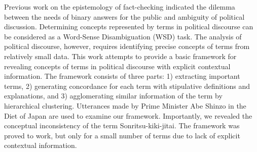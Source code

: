 Previous work on the epistemology of fact-checking indicated the dilemma between the needs of binary answers for the public and ambiguity of political discussion. Determining concepts represented by terms in political discourse can be considered as a Word-Sense Disambiguation (WSD) task. The analysis of political discourse, however, requires identifying precise concepts of terms from relatively small data. This work attempts to provide a basic framework for revealing concepts of terms in political discourse with explicit contextual information. The framework consists of three parts: 1) extracting important terms, 2) generating concordance for each term with stipulative definitions and explanations, and 3) agglomerating similar information of the term by hierarchical clustering. Utterances made by Prime Minister Abe Shinzo in the Diet of Japan are used to examine our framework. Importantly, we revealed the conceptual inconsistency of the term Sonritsu-kiki-jitai. The framework was proved to work, but only for a small number of terms due to lack of explicit contextual information.

